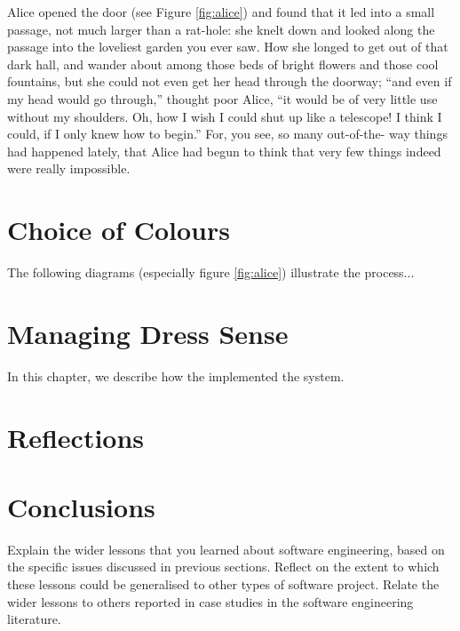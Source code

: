 \documentclass{l3proj}
\begin{document}


Alice opened the door (see Figure \ref{fig:alice}) and found that it
led into a small passage, not much larger than a rat-hole: she knelt
down and looked along the passage into the loveliest garden you ever
saw. How she longed to get out of that dark hall, and wander about
among those beds of bright flowers and those cool fountains, but she
could not even get her head through the doorway; ``and even if my head
would go through,'' thought poor Alice, ``it would be of very little
use without my shoulders. Oh, how I wish I could shut up like a
telescope! I think I could, if I only knew how to begin.'' For, you
see, so many out-of-the- way things had happened lately, that Alice
had begun to think that very few things indeed were really impossible.


\section{Choice of Colours}
\label{design}

The following diagrams (especially figure \ref{fig:alice}) illustrate the
process...

\section{Managing Dress Sense}
\label{managing}

In this chapter, we describe how the implemented the system.

\section{Reflections}
\label{sec:reflections}

\section{Conclusions}
\label{sec:conclusions}

Explain the wider lessons that you learned about software engineering,
based on the specific issues discussed in previous sections.  Reflect
on the extent to which these lessons could be generalised to other
types of software project.  Relate the wider lessons to others
reported in case studies in the software engineering literature.



\end{document}
